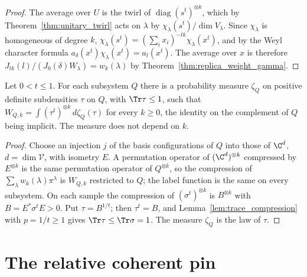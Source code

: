 \begin{proof}\leanok
    The average over $U$ is the twirl of $\operatorname{diag}(s^t)^{\otimes k}$, which by
    Theorem~\ref{thm:unitary_twirl} acts on $\lambda$ by $\chi_\lambda(s^t)/\dim V_\lambda$.
    Since $\chi_\lambda$ is homogeneous of degree $k$,
    $\chi_\lambda(s^t)=(\sum_ix_i)^{-tk}\chi_\lambda(x^t)$, and by the Weyl character formula
    $a_\delta(x^t)\chi_\lambda(x^t)=a_l(x^t)$. The average over $x$ is therefore
    $J_{tk}(l)/(J_0(\delta)W_\lambda)=w_k(\lambda)$ by Theorem~\ref{thm:replica_weight_gamma}.
\end{proof}

\begin{theorem}
    \label{thm:replica_metric_integral}
    \leanok
    Let $0<t\le1$. For each subsystem $Q$ there is a probability measure $\zeta_Q$ on positive
    definite subdensities $\tau$ on $Q$, with $\Tr\tau\le1$, such that
    $W_{Q,k}=\int(\tau^t)^{\otimes k}\,d\zeta_Q(\tau)$ for every $k\ge0$, the identity on the
    complement of $Q$ being implicit. The measure does not depend on $k$.
\end{theorem}

\begin{proof}\leanok
    Choose an injection $j$ of the basis configurations of $Q$ into those of $\C^d$,
    $d=\dim\mathcal V$, with isometry $E$. A permutation operator of $(\C^d)^{\otimes k}$
    compressed by $E^{\otimes k}$ is the same permutation operator of $Q^{\otimes k}$, so the
    compression of $\sum_\lambda w_k(\lambda)\pi^\lambda$ is $W_{Q,k}$ restricted to $Q$; the
    label function is the same on every subsystem. On each sample the compression of
    $(\sigma^t)^{\otimes k}$ is $B^{\otimes k}$ with $B=E^\ast\sigma^tE>0$. Put $\tau=B^{1/t}$;
    then $\tau^t=B$, and Lemma~\ref{lem:trace_compression} with $p=1/t\ge1$ gives
    $\Tr\tau\le\Tr\sigma=1$. The measure $\zeta_Q$ is the law of $\tau$.
\end{proof}

\section{The relative coherent pin}

